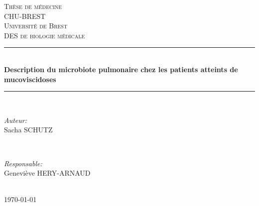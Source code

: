 \documentclass[12pt,a4paper]{article}
\newcommand{\HRule}{\rule{\linewidth}{0.5mm}} %
\begin{document}
\begin{titlepage}
\center







\textsc{\LARGE Thèse de médecine}\\[1.5cm]
\textsc{\Large CHU-BREST}\\[0.5cm]
\textsc{\large Université de Brest\\
DES de biologie médicale \
}\\[0.5cm]

\HRule \\[0.8cm]

{ \huge \bfseries Description du microbiote pulmonaire chez les patients atteints de mucoviscidoses}\\[0.4cm]

\HRule \\[1.2cm]

\begin{minipage}{0.4\textwidth}
 \begin{flushleft} \large
     \emph{Auteur:}\\
     Sacha SCHUTZ
 \end{flushleft}
\end{minipage}
~
\begin{minipage}{0.4\textwidth}
 \begin{flushright} \large
     \emph{Responsable:} \\
     Geneviève HERY-ARNAUD
 \end{flushright}
\end{minipage}\\[2cm]

{\large \today}\\[8cm] %


\end{titlepage}
\end{document}
